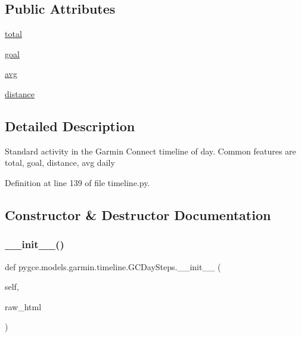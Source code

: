 \subsection*{Public Attributes}
\begin{DoxyCompactItemize}
\item 
\hyperlink{classpygce_1_1models_1_1garmin_1_1timeline_1_1_g_c_day_steps_accaf8fa0f07a44164f5e2ee3a4c5fca7}{total}
\item 
\hyperlink{classpygce_1_1models_1_1garmin_1_1timeline_1_1_g_c_day_steps_a60204221cb98c4d801fa4265c2dbf5ef}{goal}
\item 
\hyperlink{classpygce_1_1models_1_1garmin_1_1timeline_1_1_g_c_day_steps_a598091ff91043c28a7bb4711f861ff71}{avg}
\item 
\hyperlink{classpygce_1_1models_1_1garmin_1_1timeline_1_1_g_c_day_steps_a3fe1eac606ace83c095f9c376d1e09ba}{distance}
\end{DoxyCompactItemize}


\subsection{Detailed Description}
\begin{DoxyVerb}Standard activity in the Garmin Connect timeline of day.
Common features are total, goal, distance, avg daily
\end{DoxyVerb}
 

Definition at line 139 of file timeline.\+py.



\subsection{Constructor \& Destructor Documentation}
\mbox{\label{classpygce_1_1models_1_1garmin_1_1timeline_1_1_g_c_day_steps_a0b8cc0a273e2a35d5326b3e06c39e4a1}} 
\subsubsection{\texorpdfstring{\+\_\+\+\_\+init\+\_\+\+\_\+()}{\_\_init\_\_()}}
{\footnotesize\ttfamily def pygce.\+models.\+garmin.\+timeline.\+G\+C\+Day\+Steps.\+\_\+\+\_\+init\+\_\+\+\_\+ (\begin{DoxyParamCaption}\item[{}]{self,  }\item[{}]{raw\+\_\+html }\end{DoxyParamCaption})}

